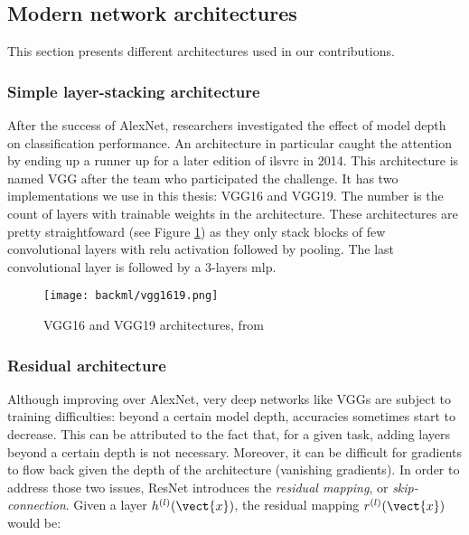
\subsection{Modern network architectures}
\label{ssec:backml:dl:modernarchi}

This section presents different architectures used in our contributions. 

\subsubsection{Simple layer-stacking architecture}
\label{sssec:backml:arch:layerstacking}
After the success of AlexNet, researchers investigated the effect of model depth on classification performance. An architecture in particular caught the attention by ending up a runner up for a later edition of \acrshort{ilsvrc} in 2014. This architecture is named VGG \parencite{simonyan2014very} after the team who participated the challenge. It has two implementations we use in this thesis: VGG16 and VGG19. The number is the count of layers with trainable weights in the architecture. These architectures are pretty straightfoward (see Figure \ref{fig:backml:vgg}) as they only stack blocks of few convolutional layers with \acrshort{relu} activation followed by pooling. The last convolutional layer is followed by a 3-layers \acrshort{mlp}. 

\begin{figure}
  \centering
  \texttt{[image: backml/vgg1619.png]}
  \caption{VGG16 and VGG19 architectures, from \parencite{img:vgg1619}}
  \label{fig:backml:vgg}
\end{figure}

\subsubsection{Residual architecture}
\label{sssec:backml:arch:residual}

Although improving over AlexNet, very deep networks like VGGs are subject to training difficulties: beyond a certain model depth, accuracies sometimes start to decrease. This can be attributed to the fact that, for a given task, adding layers beyond a certain depth is not necessary. Moreover, it can be difficult for gradients to flow back given the depth of the architecture (\ie vanishing gradients). In order to address those two issues, ResNet \parencite{he2016deep} introduces the \textit{residual mapping}, or \textit{skip-connection}. Given a layer $h^{(l)}(\vect{x})$, the residual mapping $r^{(l)}(\vect{x})$ would be:

